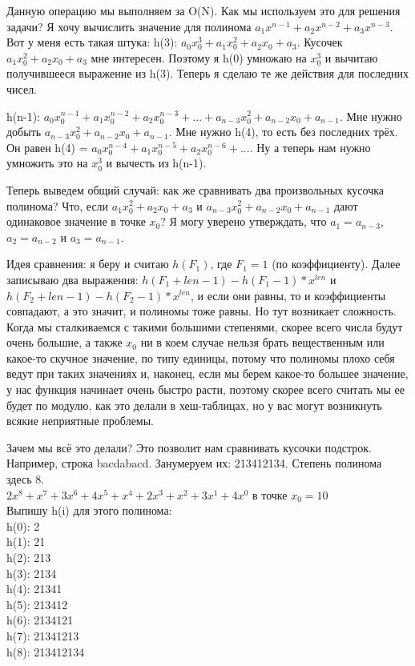 \documentclass[12pt]{article}
\begin{document}
Данную операцию мы выполняем за O(N). Как мы используем это для решения задачи? Я хочу вычислить значение для полинома $a_{1}x^{n-1} + a_{2}x^{n-2} + a_{3}x^{n-3}$. Вот у меня есть такая штука: h(3): $a_{0}x_{0}^{3} + a_{1}x_{0}^{2} + a_{2}x_{0} + a_{3}$. Кусочек $a_{1}x_{0}^{2} + a_{2}x_{0} + a_{3}$ мне интересен. Поэтому я h(0) умножаю на $x_{0}^{3}$ и вычитаю получившееся выражение из h(3). Теперь я сделаю те же действия для последних чисел.

h(n-1): $a_{0}x_{0}^{n-1} + a_{1}x_{0}^{n-2} + a_{2}x_{0}^{n-3} + ... + a_{n-3}x_{0}^{2} + a_{n-2}x_{0} + a_{n-1}$. Мне нужно добыть $a_{n-3}x_{0}^{2} + a_{n-2}x_{0} + a_{n-1}$. Мне нужно h(4), то есть без последних трёх. Он равен h(4) = $a_{0}x_{0}^{n-4} + a_{1}x_{0}^{n-5} + a_{2}x_{0}^{n-6} + ...$. Ну а теперь нам нужно умножить это на $x_{0}^3$ и вычесть из h(n-1).

Теперь выведем общий случай: как же сравнивать два произвольных кусочка полинома? Что, если $a_{1}x_{0}^{2} + a_{2}x_{0} + a_{3}$ и $a_{n-3}x_{0}^{2} + a_{n-2}x_{0} + a_{n-1}$ дают одинаковое значение в точке $x_{0}$? Я могу уверено утверждать, что $a_{1} = a_{n-3}$, $a_{2} = a_{n-2}$ и $a_{3} = a_{n-1}$.

Идея сравнения: я беру и считаю $h(F_{1})$, где $F_{1} = 1$ (по коэффициенту). Далее записываю два выражения: $h(F_{1} + len - 1) - h(F_{1} - 1) * x^{len}$ и $h(F_{2} + len - 1) - h(F_{2} - 1) * x^{len}$, и если они равны, то и коэффициенты совпадают, а это значит, и полиномы тоже равны. Но тут возникает сложность. Когда мы сталкиваемся с такими большими степенями, скорее всего числа будут очень большие, а также $x_0$ ни в коем случае нельзя брать вещественным или какое-то скучное значение, по типу единицы, потому что полиномы плохо себя ведут при таких значениях и, наконец, если мы берем какое-то большее значение, у нас функция начинает очень быстро расти, поэтому скорее всего считать мы ее будет по модулю, как это делали в хеш-таблицах, но у вас могут возникнуть всякие неприятные проблемы.

Зачем мы всё это делали? Это позволит нам сравнивать кусочки подстрок. Например, строка bacdabacd. Занумеруем их: 213412134. Степень полинома здесь 8.
\\
$2x^8 + x^7 + 3x^6 + 4x^5 + x^4 + 2x^3 + x^2 + 3x^1 + 4x^0$ в точке $x_0 = 10$\\
Выпишу h(i) для этого полинома:\\
h(0): 2\\
h(1): 21\\
h(2): 213\\
h(3): 2134\\
h(4): 21341\\
h(5): 213412\\
h(6): 2134121\\
h(7): 21341213\\
h(8): 213412134
\end{document}
